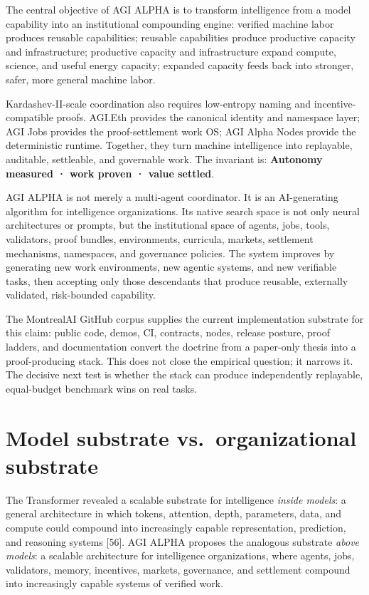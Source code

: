 The central objective of AGI ALPHA is to transform intelligence from a
model capability into an institutional compounding engine: verified
machine labor produces reusable capabilities; reusable capabilities
produce productive capacity and infrastructure; productive capacity and
infrastructure expand compute, science, and useful energy capacity;
expanded capacity feeds back into stronger, safer, more general machine
labor.

Kardashev-II-scale coordination also requires low-entropy naming and
incentive-compatible proofs. AGI.Eth provides the canonical identity and
namespace layer; AGI Jobs provides the proof-settlement work OS; AGI
Alpha Nodes provide the deterministic runtime. Together, they turn
machine intelligence into replayable, auditable, settleable, and
governable work. The invariant is: \textbf{Autonomy measured · work
proven · value settled}.

AGI ALPHA is not merely a multi-agent coordinator. It is an
AI-generating algorithm for intelligence organizations. Its native
search space is not only neural architectures or prompts, but the
institutional space of agents, jobs, tools, validators, proof bundles,
environments, curricula, markets, settlement mechanisms, namespaces, and
governance policies. The system improves by generating new work
environments, new agentic systems, and new verifiable tasks, then
accepting only those descendants that produce reusable, externally
validated, risk-bounded capability.

The MontrealAI GitHub corpus supplies the current implementation
substrate for this claim: public code, demos, CI, contracts, nodes,
release posture, proof ladders, and documentation convert the doctrine
from a paper-only thesis into a proof-producing stack. This does not
close the empirical question; it narrows it. The decisive next test is
whether the stack can produce independently replayable, equal-budget
benchmark wins on real tasks.

\section{Model substrate vs.~organizational
substrate}\label{model-substrate-vs.-organizational-substrate}

The Transformer revealed a scalable substrate for intelligence
\emph{inside models}: a general architecture in which tokens, attention,
depth, parameters, data, and compute could compound into increasingly
capable representation, prediction, and reasoning systems {[}56{]}. AGI
ALPHA proposes the analogous substrate \emph{above models}: a scalable
architecture for intelligence organizations, where agents, jobs,
validators, memory, incentives, markets, governance, and settlement
compound into increasingly capable systems of verified work.

